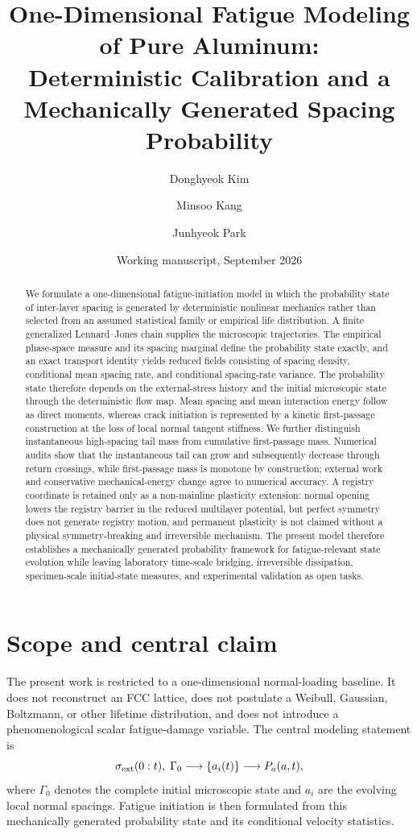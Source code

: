 \documentclass[11pt]{article}
\title{One-Dimensional Fatigue Modeling of Pure Aluminum:\\Deterministic Calibration and a Mechanically Generated Spacing Probability}
\author{Donghyeok Kim \and Minsoo Kang \and Junhyeok Park}
\date{Working manuscript, September 2026}
\begin{document}
\maketitle

\begin{abstract}
We formulate a one-dimensional fatigue-initiation model in which the probability state of inter-layer spacing is generated by deterministic nonlinear mechanics rather than selected from an assumed statistical family or empirical life distribution. A finite generalized Lennard--Jones chain supplies the microscopic trajectories. The empirical phase-space measure and its spacing marginal define the probability state exactly, and an exact transport identity yields reduced fields consisting of spacing density, conditional mean spacing rate, and conditional spacing-rate variance. The probability state therefore depends on the external-stress history and the initial microscopic state through the deterministic flow map. Mean spacing and mean interaction energy follow as direct moments, whereas crack initiation is represented by a kinetic first-passage construction at the loss of local normal tangent stiffness. We further distinguish instantaneous high-spacing tail mass from cumulative first-passage mass. Numerical audits show that the instantaneous tail can grow and subsequently decrease through return crossings, while first-passage mass is monotone by construction; external work and conservative mechanical-energy change agree to numerical accuracy. A registry coordinate is retained only as a non-mainline plasticity extension: normal opening lowers the registry barrier in the reduced multilayer potential, but perfect symmetry does not generate registry motion, and permanent plasticity is not claimed without a physical symmetry-breaking and irreversible mechanism. The present model therefore establishes a mechanically generated probability framework for fatigue-relevant state evolution while leaving laboratory time-scale bridging, irreversible dissipation, specimen-scale initial-state measures, and experimental validation as open tasks.
\end{abstract}

\section{Scope and central claim}
The present work is restricted to a one-dimensional normal-loading baseline. It does not reconstruct an FCC lattice, does not postulate a Weibull, Gaussian, Boltzmann, or other lifetime distribution, and does not introduce a phenomenological scalar fatigue-damage variable. The central modeling statement is
\begin{equation}
\sigma_{\rm ext}(0:t),\;\Gamma_0
\longrightarrow
\{a_i(t)\}
\longrightarrow
P_a(a,t),
\end{equation}
where \(\Gamma_0\) denotes the complete initial microscopic state and \(a_i\) are the evolving local normal spacings. Fatigue initiation is then formulated from this mechanically generated probability state and its conditional velocity statistics.
\end{document}
